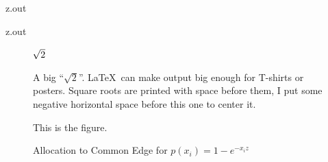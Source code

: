 \MyIO


\begin{VerbatimOut}{z.out}

\end{VerbatimOut}

\MyIO


\begin{VerbatimOut}{z.out}

\newpage

\begin{figure}[ht]
  \centering 
    {\fontsize{5in}{5in}\selectfont\(\hspace*{-0.07em}\sqrt 2\)}
    \caption{%
      A big ``\(\sqrt 2\)''.
      \LaTeX\ can make output big enough for T-shirts or posters.
      Square roots are printed with space before them,
      I put some negative horizontal space before this one to center it.%
    }
\end{figure}
\end{VerbatimOut}

\MyIO

\UndefineShortVerb{\|}  %
\DefineShortVerb{\|}  %


\begin{figure}
  This is the figure.
  \caption{%
    Allocation to Common Edge for
    \(p(x_i) = 1-e^{-x_iz}\)%
  }
\end{figure}

